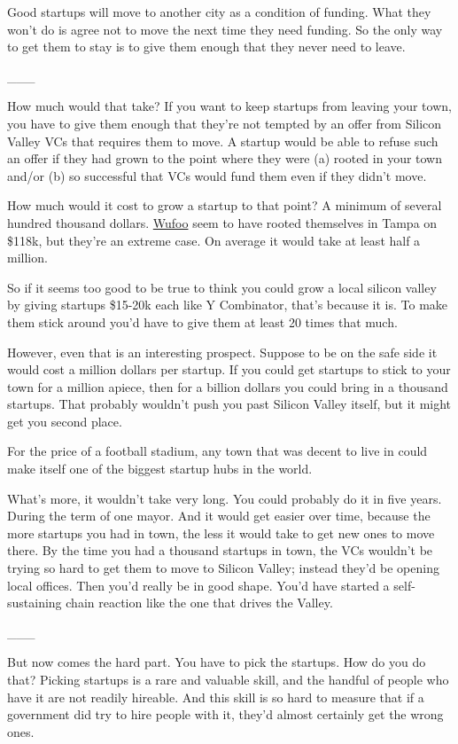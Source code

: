 \documentclass[12pt]{book}
\begin{document}
Good startups will move to another city as a condition of funding. What
they won't do is agree not to move the next time they need funding. So
the only way to get them to stay is to give them enough that they never
need to leave.

\_\_\_

How much would that take? If you want to keep startups from leaving your
town, you have to give them enough that they're not tempted by an offer
from Silicon Valley VCs that requires them to move. A startup would be
able to refuse such an offer if they had grown to the point where they
were (a) rooted in your town and/or (b) so successful that VCs would
fund them even if they didn't move.

How much would it cost to grow a startup to that point? A minimum of
several hundred thousand dollars. \href{http://wufoo.com}{Wufoo} seem to
have rooted themselves in Tampa on \$118k, but they're an extreme case.
On average it would take at least half a million.

So if it seems too good to be true to think you could grow a local
silicon valley by giving startups \$15-20k each like Y Combinator,
that's because it is. To make them stick around you'd have to give them
at least 20 times that much.

However, even that is an interesting prospect. Suppose to be on the safe
side it would cost a million dollars per startup. If you could get
startups to stick to your town for a million apiece, then for a billion
dollars you could bring in a thousand startups. That probably wouldn't
push you past Silicon Valley itself, but it might get you second place.

For the price of a football stadium, any town that was decent to live in
could make itself one of the biggest startup hubs in the world.

What's more, it wouldn't take very long. You could probably do it in
five years. During the term of one mayor. And it would get easier over
time, because the more startups you had in town, the less it would take
to get new ones to move there. By the time you had a thousand startups
in town, the VCs wouldn't be trying so hard to get them to move to
Silicon Valley; instead they'd be opening local offices. Then you'd
really be in good shape. You'd have started a self-sustaining chain
reaction like the one that drives the Valley.

\_\_\_

But now comes the hard part. You have to pick the startups. How do you
do that? Picking startups is a rare and valuable skill, and the handful
of people who have it are not readily hireable. And this skill is so
hard to measure that if a government did try to hire people with it,
they'd almost certainly get the wrong ones.
\end{document}

